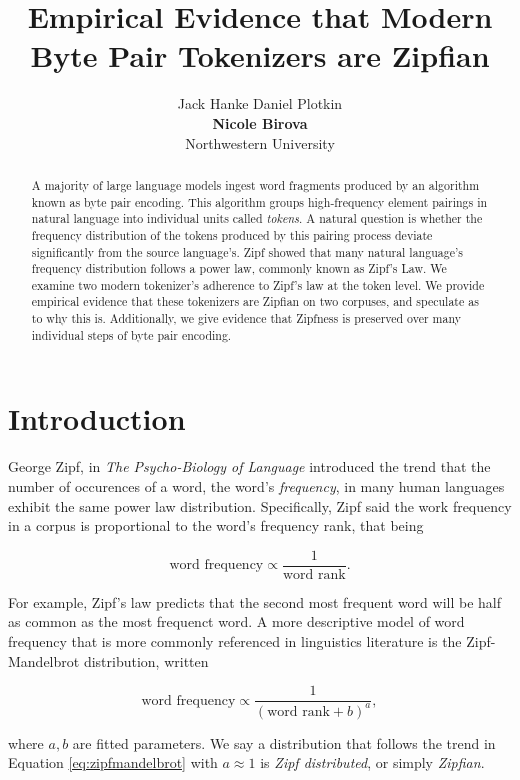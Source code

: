 \documentclass[11pt]{article}
\title{Empirical Evidence that Modern Byte Pair Tokenizers are Zipfian}
\author{Jack Hanke \qquad Daniel Plotkin \\ 
        {\bf Nicole Birova} \qquad {\bf David Demeter} \\
        Northwestern University }
\begin{document}
\maketitle
\begin{abstract}
A majority of large language models ingest word fragments produced by an algorithm known as byte pair encoding. This algorithm groups high-frequency element pairings in natural language into individual units called \textit{tokens}. A natural question is whether the frequency distribution of the tokens produced by this pairing process deviate significantly from the source language's. Zipf showed that many natural language's frequency distribution follows a power law, commonly known as Zipf's Law. We examine two modern tokenizer's adherence to Zipf's law at the token level. We provide empirical evidence that these tokenizers are Zipfian on two corpuses, and speculate as to why this is. Additionally, we give evidence that Zipfness is preserved over many individual steps of byte pair encoding.
\end{abstract}

\section{Introduction}
\label{section:intro}

George Zipf, in \textit{The Psycho-Biology of Language} \cite{Zip35} introduced the trend that the number of occurences of a word, the word's \textit{frequency}, in many human languages exhibit the same power law distribution. Specifically, Zipf said the work frequency in a corpus is proportional to the word's frequency rank, that being

\begin{equation}
    \mbox{word frequency} \propto \frac{1}{\mbox{word rank}}.
\end{equation}

For example, Zipf's law predicts that the second most frequent word will be half as common as the most frequenct word. A more descriptive model of word frequency that is more commonly referenced in linguistics literature is the Zipf-Mandelbrot distribution, written

\begin{equation}
    \mbox{word frequency} \propto \frac{1}{(\mbox{word rank} + b)^a}, 
    \label{eq:zipfmandelbrot}
\end{equation}

where $a,b$ are fitted parameters. We say a distribution that follows the trend in Equation \ref{eq:zipfmandelbrot} with $a \approx 1$ is \textit{Zipf distributed}, or simply \textit{Zipfian}.
\end{document}
